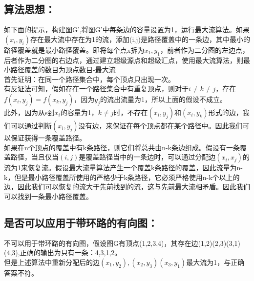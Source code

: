 \documentclass[UTF8]{ctexart}
\begin{document}
\subsection{算法思想：}

如下面的提示，构建图G',将图G'中每条边的容量设置为1，运行最大流算法。如果$(x_i, y_i)$存在最大流中存在为1的流，添加(i,j)是路径覆盖中的一条边，其中最小的路径覆盖就是最小路径覆盖。即将每个点x拆为$x_1, y_1$，前者作为二分图的左边点，后者作为二分图的右边点，通过建立超级源点和超级汇点，使用最大流算法，则最小路径覆盖的数目为顶点数目-最大流\\

首先证明：在同一个路径集合中，每个顶点只出现一次。\\
有反证法可知，假如存在一个路径集合中有重复顶点，则对于$i \neq k \neq j$，存在$f(x_i, y_j) = f(x_k, y_j)$，因为$y_j$的流出流量为1，所以上面的假设不成立。\\

此外，因为从s到$x_i$的容量为1，$k \neq j$时，不存在$(x_i, y_j)$和$(x_i, y_k)$形式的边，我们可以通过判断$(x_i, y_j)$没有边，来保证在每个顶点都在某个路径中。因此我们可以保证获得一条覆盖路径。\\

如果在n个顶点的覆盖中有k条路径，则它们将总共由n-k条边组成。假设有一条覆盖路径，当且仅当$(i,j)$是覆盖路径当中的一条边时，可以通过分配边$(x_i,x_j)$的流为1来恢复流。假设最大流量算法产生一个覆盖k条路径的覆盖，因此流量为n-k，但是最小路径覆盖所使用的严格少于k条路径，它必须严格使用n-k个以上的边，因此我们可以恢复的流大于先前找到的流，这与先前最大流相矛盾。因此我们可以找到一条最小路径覆盖。

\subsection{是否可以应用于带环路的有向图：}

不可以用于带环路的有向图，假设图G有顶点(1,2,3,4)，其存在边(1,2)(2,3)(3,1)(4,3),正确的输出为只有一条：4,3,1,2。\\
但是上述算法中重新分配后的边$(x_1,y_2), (x_2,y_3)(x_3, y_1)$最大流为1，与正确答案不符。
\end{document}
